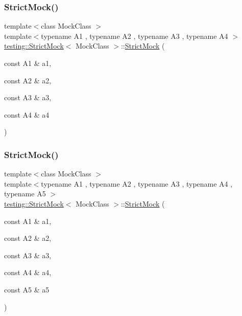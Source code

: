 \subsubsection{\texorpdfstring{StrictMock()}{StrictMock()}\hspace{0.1cm}{\footnotesize\ttfamily [5/11]}}
{\footnotesize\ttfamily template$<$class Mock\+Class $>$ \\
template$<$typename A1 , typename A2 , typename A3 , typename A4 $>$ \\
\mbox{\hyperlink{classtesting_1_1StrictMock}{testing\+::\+Strict\+Mock}}$<$ Mock\+Class $>$\+::\mbox{\hyperlink{classtesting_1_1StrictMock}{Strict\+Mock}} (\begin{DoxyParamCaption}\item[{const A1 \&}]{a1,  }\item[{const A2 \&}]{a2,  }\item[{const A3 \&}]{a3,  }\item[{const A4 \&}]{a4 }\end{DoxyParamCaption})\hspace{0.3cm}{\ttfamily [inline]}}

\mbox{\label{classtesting_1_1StrictMock_a2019f4e86224b2adbb9e9326bc175c50}} 
\subsubsection{\texorpdfstring{StrictMock()}{StrictMock()}\hspace{0.1cm}{\footnotesize\ttfamily [6/11]}}
{\footnotesize\ttfamily template$<$class Mock\+Class $>$ \\
template$<$typename A1 , typename A2 , typename A3 , typename A4 , typename A5 $>$ \\
\mbox{\hyperlink{classtesting_1_1StrictMock}{testing\+::\+Strict\+Mock}}$<$ Mock\+Class $>$\+::\mbox{\hyperlink{classtesting_1_1StrictMock}{Strict\+Mock}} (\begin{DoxyParamCaption}\item[{const A1 \&}]{a1,  }\item[{const A2 \&}]{a2,  }\item[{const A3 \&}]{a3,  }\item[{const A4 \&}]{a4,  }\item[{const A5 \&}]{a5 }\end{DoxyParamCaption})\hspace{0.3cm}{\ttfamily [inline]}}

